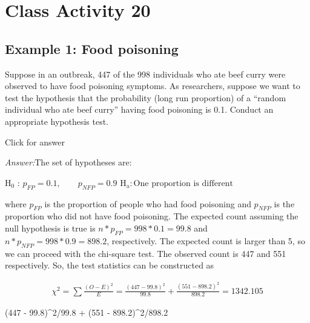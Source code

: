 \documentclass[
]{book}
\newenvironment{Shaded}{\begin{snugshade}}{\end{snugshade}}
\newcommand{\DecValTok}[1]{\textcolor[rgb]{0.00,0.00,0.81}{#1}}
\newcommand{\FloatTok}[1]{\textcolor[rgb]{0.00,0.00,0.81}{#1}}
\newcommand{\NormalTok}[1]{#1}
\newcommand{\SpecialCharTok}[1]{\textcolor[rgb]{0.00,0.00,0.00}{#1}}
\begin{document}
\hypertarget{class-activity-20}{%
\chapter{Class Activity 20}\label{class-activity-20}}

\hypertarget{example-1-food-poisoning}{%
\section{Example 1: Food poisoning}\label{example-1-food-poisoning}}

Suppose in an outbreak, 447 of the 998 individuals who ate beef curry were observed to have food poisoning symptoms. As researchers, suppose we want to test the hypothesis that the probability (long run proportion) of a ``random individual who ate beef curry'' having food poisoning is 0.1. Conduct an appropriate hypothesis test.

Click for answer

\emph{Answer:}The set of hypotheses are:

\(\mathrm{H}_0\) : \(p_{FP} = 0.1, \qquad p_{NFP} = 0.9\)
\(\mathrm{H}_{\mathrm{a}} : \text{One proportion is different}\)

where \(p_{FP}\) is the proportion of people who had food poisoning and \(p_{NFP}\) is the proportion who did not have food poisoning. The expected count assuming the null hypothesis is true is \(n*p_{FP} = 998*0.1 = 99.8\) and \(n*p_{NFP} = 998*0.9 = 898.2\), respectively. The expected count is larger than 5, so we can proceed with the chi-square test. The observed count is 447 and 551 respectively. So, the test statistics can be constructed as

\begin{align*}
\chi^2 = \sum \frac{(O-E)^2}{E} = \frac{(447 - 99.8)^2}{99.8} +   \frac{(551 - 898.2)^2}{898.2}= 1342.105
\end{align*}

\begin{Shaded}
\begin{Highlighting}[]
\NormalTok{(}\DecValTok{447} \SpecialCharTok{{-}} \FloatTok{99.8}\NormalTok{)}\SpecialCharTok{\^{}}\DecValTok{2}\SpecialCharTok{/}\FloatTok{99.8} \SpecialCharTok{+}\NormalTok{ (}\DecValTok{551} \SpecialCharTok{{-}} \FloatTok{898.2}\NormalTok{)}\SpecialCharTok{\^{}}\DecValTok{2}\SpecialCharTok{/}\FloatTok{898.2}
\end{Highlighting}
\end{Shaded}
\end{document}
